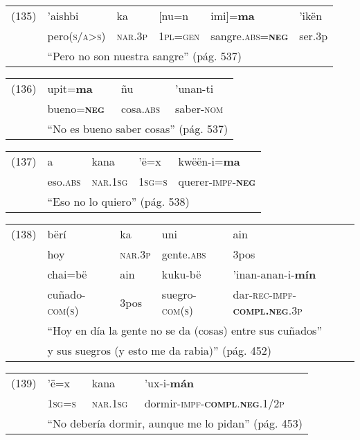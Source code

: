 {\setmainfont{Charis SIL}

\begin{tabular}{llllll}
(135) & 'aishbi & ka & [nu=n & imi]=\textbf{ma} & 'ikën \\
& pero(\textsc{s/a>s}) & \textsc{nar.3p} & \textsc{1pl=gen} & sangre.\textsc{abs=\textbf{neg}} & ser.3p \\
& \multicolumn{5}{l}{``Pero no son nuestra sangre'' (pág. 537)}
\end{tabular} \vspace{0.3cm}

\begin{tabular}{llll}
(136) & upit=\textbf{ma} & ñu & 'unan-ti \\
& bueno=\textsc{\textbf{neg}} & cosa.\textsc{abs} & saber-\textsc{nom} \\
& \multicolumn{3}{l}{``No es bueno saber cosas'' (pág. 537)}
\end{tabular} \vspace{0.3cm}

\begin{tabular}{lllll}
(137) & a & kana & 'ë=x & kwëën-i=\textbf{ma} \\
& eso.\textsc{abs} & \textsc{nar.1sg} & \textsc{1sg=s} & querer-\textsc{impf-\textbf{neg}} \\
& \multicolumn{4}{l}{``Eso no lo quiero'' (pág. 538)}
\end{tabular} \vspace{0.3cm}

\begin{tabular}{lllll}
(138) & bërí & ka & uni & ain \\
& hoy & \textsc{nar.3p} & gente.\textsc{abs} & 3pos \\
& chai=bë & ain & kuku-bë & 'inan-anan-i-\textbf{mín} \\
& cuñado-\textsc{com(s)} & 3pos & suegro-\textsc{com(s)} & dar-\textsc{rec-impf-\textbf{compl.neg}.3p} \\
& \multicolumn{4}{l}{``Hoy en día la gente no se da (cosas) entre sus cuñados''} \\
& \multicolumn{4}{l}{y sus suegros (y esto me da rabia)'' (pág. 452)}
\end{tabular} \vspace{0.3cm}

\begin{tabular}{llll}
(139) & 'ë=x & kana & 'ux-i-\textbf{mán} \\
& \textsc{1sg=s} & \textsc{nar.1sg} & dormir-\textsc{impf-\textbf{compl}.\textbf{neg}.1/2p} \\
& \multicolumn{3}{l}{``No debería dormir, aunque me lo pidan'' (pág. 453)}
\end{tabular} \vspace{0.5cm}

}

